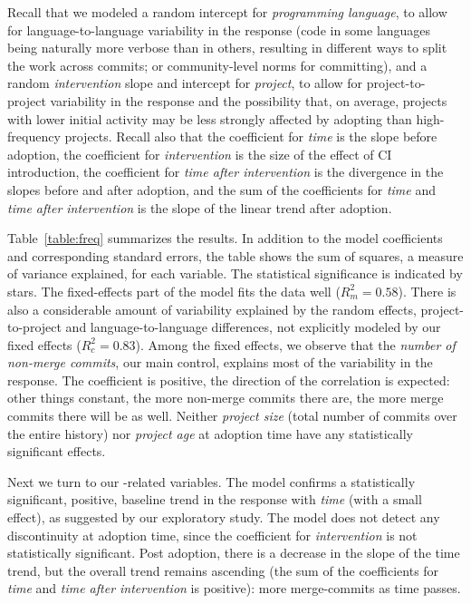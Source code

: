 Recall that we modeled a random intercept for \emph{programming language}, 
to allow for language-to-language variability in the response (\ie code in some 
languages being naturally more verbose than in others, resulting in different
ways to split the work across commits; or community-level norms for committing), 
and a random \emph{intervention} slope and intercept for \emph{project}, to allow 
for project-to-project variability in the response and the possibility that, on average, 
projects with lower initial activity may be less strongly affected by adopting 
\Tvis than high-frequency projects.
Recall also that the coefficient for \emph{time} is the slope before adoption,
the coefficient for \emph{intervention} is the size of the effect of CI introduction,
the coefficient for \emph{time after intervention} is the divergence in the slopes
before and after \Tvis adoption, and the sum of the coefficients for \emph{time}
and \emph{time after intervention} is the slope of the linear trend after \Tvis
adoption.

Table~\ref{table:freq} summarizes the results.
In addition to the model coefficients and corresponding standard errors, the table 
shows the sum of squares, a measure of variance explained, for each variable.
The statistical significance is indicated by stars.
The fixed-effects part of the model fits the data well ($R_m^2=0.58$).
There is also a considerable amount of variability explained by the random
effects, \ie project-to-project and language-to-language differences, not 
explicitly modeled by our fixed effects ($R_c^2=0.83$).
Among the fixed effects, we observe that the \emph{number of non-merge 
commits}, our main control, explains most of the variability in the response.
The coefficient is positive, \ie the direction of the correlation is expected: 
other things constant, the more non-merge commits there are, the more 
merge commits there will be as well.
Neither \emph{project size} (total number of commits over the entire history) nor 
\emph{project age} at adoption time have any statistically significant effects.

Next we turn to our \Tvi-related variables.
The model confirms a statistically significant, positive, baseline trend in the response 
with \emph{time} (with a small effect), as suggested by our exploratory study.
The model does not detect any discontinuity at adoption time, since the coefficient 
for \emph{intervention} is not statistically significant.
Post adoption, there is a decrease in the slope of the time trend, but the overall 
trend remains ascending (the sum of the coefficients for \emph{time} and 
\emph{time after intervention} is positive): more merge-commits as time passes.

